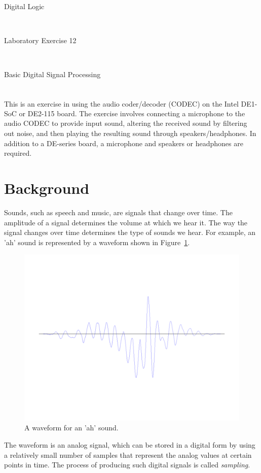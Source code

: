 \documentclass[epsfig,10pt,fullpage]{article}
\newcommand{\LabNum}{12}
\begin{document}
\centerline{\huge Digital Logic}
~\\
\centerline{\huge Laboratory Exercise \LabNum}
~\\
\centerline{\large Basic Digital Signal Processing}
~\\

This is an exercise in using the audio coder/decoder (CODEC) on the Intel\textsuperscript{\textregistered} DE1-SoC or DE2-115 board.  
The exercise involves connecting a microphone to the audio CODEC to provide input sound, 
altering the received sound by filtering out noise, and then playing the resulting 
sound through speakers/headphones. In addition to a DE-series board, a microphone and
speakers or headphones are required.


\section*{Background}
Sounds, such as speech and music, are signals that change over time. The amplitude of a 
signal determines the volume at which we hear it. The way the signal changes over time 
determines the type of sounds we hear. For example, an 'ah' sound is represented by a waveform 
shown in Figure~\ref{fig:original_waveform}.

\begin{figure}[H]
\centering
\includegraphics[width=4.5in]{figures/sound_wave_ah.pdf}
\caption{A waveform for an 'ah' sound.}
\label{fig:original_waveform}
\end{figure}

The waveform is an analog signal, which can be stored in a digital form by using a relatively 
small number of samples that represent the analog values at certain points in time. The process 
of producing such digital signals is called {\it sampling}.
\end{document}
